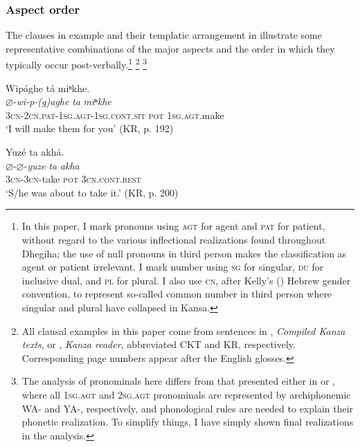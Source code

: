 \documentclass[output=paper]{LSP/langsci}
\begin{document}
\subsubsection{Aspect order} 

The clauses in example  and their templatic arrangement in  illustrate some representative combinations of the major aspects and the order in which they typically occur post-verbally.\footnote{In this paper, I mark pronouns using \textsc{agt} for agent and \textsc{pat} for patient, without regard to the various inflectional realizations found throughout Dhegiha; the use of null pronouns in third person makes the classification as agent or patient irrelevant. I mark number using \textsc{sg} for singular, \textsc{du} for inclusive dual, and \textsc{pl} for plural. I also use \textsc{cn}, after Kelly's (\citeyear{Kelly1992}) Hebrew gender convention, to represent so-called common number in third person where singular and plural have collapsed in Kansa.} \footnote{All clausal examples in this paper come from sentences in  \citet{McBrideCumberland2009}, \textit{Compiled Kanza texts}, or \citet{McBrideCumberland2010}, \textit{Kanza reader}, abbreviated CKT and KR, respectively. Corresponding page numbers appear after the English glosses.} \footnote{The analysis of pronominals here differs from that presented either in \citet{Quintero2004} or \citet{Rankin2005b}, where all \textsc{1sg.agt} and \textsc{2sg.agt} pronominals are represented by archiphonemic WA- and YA-, respectively, and phonological rules are needed to explain their phonetic realization. To simplify things, I have simply shown final realizations in the analysis.}

\ea\label{postverbalorder}

\ea\label{postverbalorder1}{Wip\'aghe t\'a miⁿkhe.\\ 
\gll
$\varnothing$-\textit{wi-p-(g)aghe}  \textit{ta}  \textit{miⁿkhe} \\
 \textsc{3cn-2cn.pat-1sg.agt-1sg.cont.sit}   \textsc{pot}   \textsc{1sg.agt}.make \\
\glt  `I will make them for you' (KR, p. 192) \\
}

\ex\label{postverbalorder2}{Yuz\'e ta akh\'a.\\ 
\gll
$\varnothing$-$\varnothing$-\textit{yuze}   \textit{ta}  \textit{akha} \\
\textsc{3cn-3cn}-take  \textsc{pot}  \textsc{3cn.cont.rest} \\
\glt  `S/he was about to take it.' (KR, p. 200) \\
}
\end{document}
